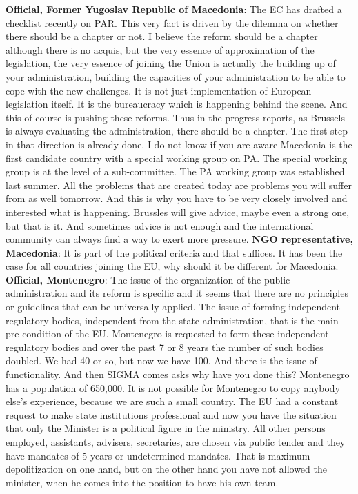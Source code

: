 \textbf{Official, Former Yugoslav Republic of Macedonia}: The EC has drafted a checklist recently on PAR. This very fact is driven by the dilemma on whether there should be a chapter or not. I believe the reform should be a chapter although there is no acquis, but the very essence of approximation of the legislation, the very essence of joining the Union is actually the building up of your administration, building the capacities of your administration to be able to cope with the new challenges. It is not just implementation of European legislation itself. It is the bureaucracy which is happening behind the scene. And this of course is pushing these reforms. Thus in the progress reports, as Brussels is always evaluating the administration, there should be a chapter. The first step in that direction is already done. I do not know if you are aware Macedonia is the first candidate country with a special working group on PA. The special working group is at the level of a sub-committee. The PA working group was established last summer. All the problems that are created today are problems you will suffer from as well tomorrow. And this is why you have to be very closely involved and interested what is happening. Brussles will give advice, maybe even a strong one, but that is it. And sometimes advice is not enough and the international community can always find a way to exert more pressure.
\textbf{NGO representative, Macedonia}: It is part of the political criteria and that suffices. It has been the case for all countries joining the EU, why should it be different for Macedonia.
\textbf{Official, Montenegro}: The issue of the organization of the public administration and its reform is specific and it seems that there are no principles or guidelines that can be universally applied. The issue of forming independent regulatory bodies, independent from the state administration, that is the main pre-condition of the EU. Montenegro is requested to form these independent regulatory bodies and over the past 7 or 8 years the number of such bodies doubled. We had 40 or so, but now we have 100. And there is the issue of functionality. And then SIGMA comes asks why have you done this? Montenegro has a population of 650,000. It is not possible for Montenegro to copy anybody else’s experience, because we are such a small country. The EU had a constant request to make state institutions professional and now you have the situation that only the Minister is a political figure in the ministry. All other persons employed, assistants, advisers, secretaries, are chosen via public tender and they have mandates of 5 years or undetermined mandates. That is maximum depolitization on one hand, but on the other hand you have not allowed the minister, when he comes into the position to have his own team. 
